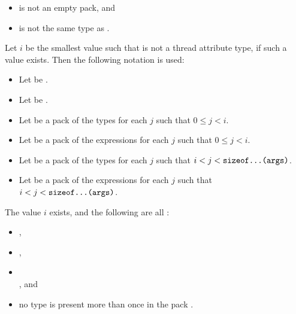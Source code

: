 \begin{itemdescr}
\pnum
\constraints
\begin{itemize}
\item
{} is not an empty pack, and
\item
{} is not the same type as .
\end{itemize}

\pnum
Let $i$ be the smallest value such that
is not a thread attribute type,
if such a value exists.
Then the following notation is used:
\begin{itemize}
\item
Let  be .
\item
Let  be .
\item
Let  be a pack of the types
 for each $j$
such that $0 \leq j < i$.
\item
Let  be a pack of the expressions
 for each $j$
such that $0 \leq j < i$.
\item
Let  be a pack of the types
 for each $j$
such that $i < j < \tcode{sizeof...(args)}$.
\item
Let  be a pack of the expressions
 for each $j$
such that $i < j < \tcode{sizeof...(args)}$.
\end{itemize}

\pnum
\mandates
The value $i$ exists, and the following are all :
\begin{itemize}
\item {},
\item {},
\item {} \\
      , and
\item no type is present more than once in the pack .
\end{itemize}


\end{itemdescr}
